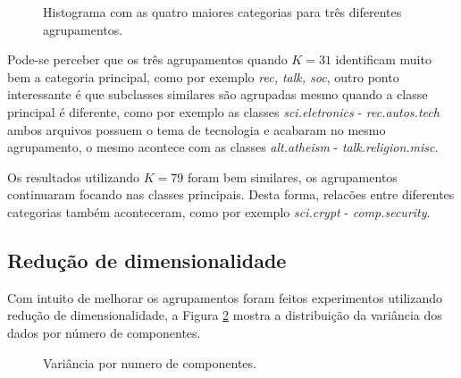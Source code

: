 \documentclass[conference]{IEEEtran}
\begin{document}
\begin{figure}[!h]
	\centering
	{
	}
	\caption{\small Histograma com as quatro maiores categorias para três diferentes agrupamentos.}
	\label{fig:clusters}
\end{figure}

Pode-se perceber que os três agrupamentos quando $K = 31$ identificam muito bem a categoria principal, como por exemplo \emph{rec, talk, soc}, outro ponto interessante é que subclasses similares são agrupadas mesmo quando a classe principal é diferente, como por exemplo as classes \emph{sci.eletronics} - \emph{rec.autos.tech} ambos arquivos possuem o tema de tecnologia e acabaram no mesmo agrupamento, o mesmo acontece com as classes \emph{alt.atheism} - \emph{talk.religion.misc}.

Os resultados utilizando $K = 79$ foram bem similares, os agrupamentos continuaram focando nas classes principais. Desta forma, relacões entre diferentes categorias também aconteceram, como por exemplo \emph{sci.crypt} - \emph{comp.security}.


\subsection{Redução de dimensionalidade}

Com intuito de melhorar os agrupamentos foram feitos experimentos utilizando redução de dimensionalidade, a Figura \ref{fig:var_comp} mostra a distribuição da variância dos dados por número de componentes.

\begin{figure}[!h]
	\centering
	{
	}
	\caption{\small Variância por numero de componentes.}
	\label{fig:var_comp}
\end{figure}
\end{document}
